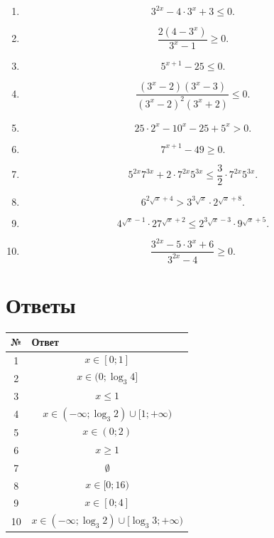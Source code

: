 \documentclass[a4paper,12pt]{article}
\begin{document}
\begin{enumerate}
\item
\[
3^{2x}-4\cdot3^x+3\le0.
\]

\item
\[
\frac{2(4-3^x)}{3^x-1}\ge0.
\]

\item
\[
5^{x+1}-25\le0.
\]

\item
\[
\frac{(3^x-2)(3^x-3)}{(3^x-2)^2(3^x+2)}\le0.
\]

\item
\[
25\cdot2^x-10^x-25+5^x>0.
\]

\item
\[
7^{x+1}-49\ge0.
\]

\item
\[
5^{2x}7^{3x}+2\cdot7^{2x}5^{3x}\le\frac32\cdot7^{2x}5^{3x}.
\]

\item
\[
6^{2\sqrt{x}+4}>3^{3\sqrt{x}}\cdot2^{\sqrt{x}+8}.
\]

\item
\[
4^{\sqrt{x}-1}\cdot27^{\sqrt{x}+2}\le
2^{3\sqrt{x}-3}\cdot9^{\sqrt{x}+5}.
\]

\item
\[
\frac{3^{2x}-5\cdot3^x+6}{3^{2x}-4}\ge0.
\]
\end{enumerate}

\newpage

\section*{\textcolor{darkaccent}{Ответы}}

\begin{center}
\renewcommand{\arraystretch}{1.55}
\begin{tabularx}{\linewidth}{@{}cX@{}}
\toprule
№ & Ответ \\
\midrule
1 &
\[
x\in[0;1]
\]
\\

2 &
\[
x\in(0;\log_3 4]
\]
\\

3 &
\[
x\le1
\]
\\

4 &
\[
x\in(-\infty;\log_3 2)\cup[1;+\infty)
\]
\\

5 &
\[
x\in(0;2)
\]
\\

6 &
\[
x\ge1
\]
\\

7 &
\[
\emptyset
\]
\\

8 &
\[
x\in[0;16)
\]
\\

9 &
\[
x\in[0;4]
\]
\\

10 &
\[
x\in(-\infty;\log_3 2)\cup[\log_3 3;+\infty)
\]
\\
\bottomrule
\end{tabularx}
\end{center}
\end{document}
